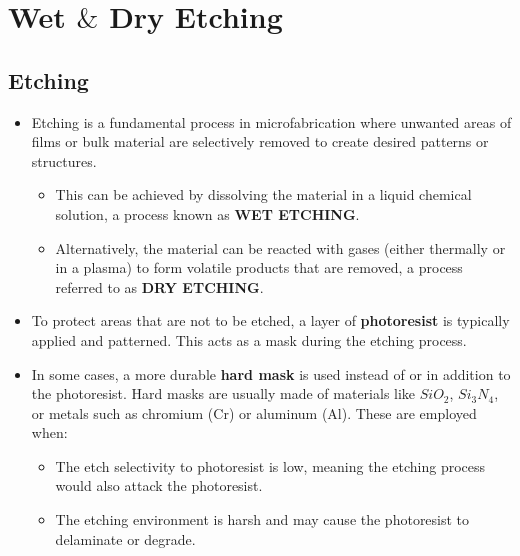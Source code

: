 \documentclass{report}
\begin{document}
\clearpage
\chapter{Wet $\&$ Dry Etching}
\section{Etching}
\begin{itemize}
    \item Etching is a fundamental process in microfabrication where unwanted areas of films or bulk material are selectively removed to create desired patterns or structures.
    \begin{itemize}
        \item This can be achieved by dissolving the material in a liquid chemical solution, a process known as \textbf{WET ETCHING}.
        \item Alternatively, the material can be reacted with gases (either thermally or in a plasma) to form volatile products that are removed, a process referred to as \textbf{DRY ETCHING}.
    \end{itemize}
    \item To protect areas that are not to be etched, a layer of \textbf{photoresist} is typically applied and patterned. This acts as a mask during the etching process.
    \item In some cases, a more durable \textbf{hard mask} is used instead of or in addition to the photoresist. Hard masks are usually made of materials like $SiO_{2}$, $Si_{3}N_{4}$, or metals such as chromium (Cr) or aluminum (Al). These are employed when:
    \begin{itemize}
        \item The etch selectivity to photoresist is low, meaning the etching process would also attack the photoresist.
        \item The etching environment is harsh and may cause the photoresist to delaminate or degrade.
    \end{itemize}
\end{itemize}
\end{document}
